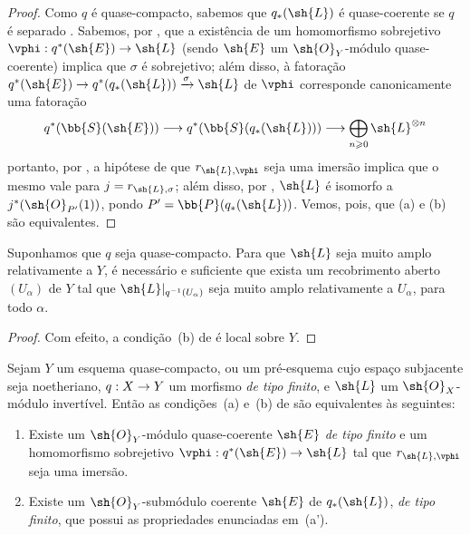 \documentclass[oneside,10pt]{amsart}
\makeatletter
\renewcommand{\geq}{\geqslant}
\newcommand{\ega@arrow}[2]{\mathchoice{#1}{#2}{#2}{#2}}
\renewcommand{\to}{\ega@arrow{\longrightarrow}{\rightarrow}}
\newcommand{\oldpage}[2][]{\marginnote{\normalfont\footnotesize\textbf{#1}~|~#2}\ignorespaces}
\let\EGAOriginalLabel\label
\renewcommand{\label}[1]{\phantomsection\EGAOriginalLabel{#1}}
\makeatother
\begin{document}
\begin{proof}
Como $q$ é quase-compacto, sabemos que $q_*(\sh{L})$ é quase-coerente se $q$ é separado .
\oldpage[II]{80}
Sabemos, por , que a existência de um homomorfismo sobrejetivo $\vphi:q^*(\sh{E})\to\sh{L}$ (sendo $\sh{E}$ um $\sh{O}_Y$-módulo quase-coerente) implica que $\sigma$ é sobrejetivo;
além disso, à fatoração $q^*(\sh{E})\to q^*(q_*(\sh{L}))\xrightarrow{\sigma}\sh{L}$ de $\vphi$ corresponde canonicamente uma fatoração
\[
  q^*(\bb{S}(\sh{E}))\to q^*(\bb{S}(q_*(\sh{L})))\to\bigoplus_{n\geq0}\sh{L}^{\otimes n}
\]
portanto, por , a hipótese de que $r_{\sh{L},\vphi}$ seja uma imersão implica que o mesmo vale para $j=r_{\sh{L},\sigma}$;
além disso, por , $\sh{L}$ é isomorfo a $j^*(\sh{O}_{P'}(1))$, pondo $P'=\bb{P}(q_*(\sh{L}))$.
Vemos, pois, que (a) e (b) são equivalentes.
\end{proof}

\begin{corollary}[4.4.5]
\label{II.4.4.5}
Suponhamos que $q$ seja quase-compacto.
Para que $\sh{L}$ seja muito amplo relativamente a $Y$, é necessário e suficiente que exista um recobrimento aberto $(U_\alpha)$ de $Y$ tal que $\sh{L}|_{q^{-1}(U_\alpha)}$ seja muito amplo relativamente a $U_\alpha$, para todo $\alpha$.
\end{corollary}

\begin{proof}
Com efeito, a condição~(b) de  é local sobre $Y$.
\end{proof}

\begin{proposition}[4.4.6]
\label{II.4.4.6}
Sejam $Y$ um esquema quase-compacto, ou um pré-esquema cujo espaço subjacente seja noetheriano, $q:X\to Y$ um morfismo \emph{de tipo finito}, e $\sh{L}$ um $\sh{O}_X$-módulo invertível.
Então as condições~(a) e~(b) de  são equivalentes às seguintes:
\begin{enumerate}
  \item[\rm{(a')}] Existe um $\sh{O}_Y$-módulo quase-coerente $\sh{E}$ \emph{de tipo finito} e um homomorfismo sobrejetivo $\vphi:q^*(\sh{E})\to\sh{L}$ tal que $r_{\sh{L},\vphi}$ seja uma imersão.
  \item[\rm{(b')}] Existe um $\sh{O}_Y$-submódulo coerente $\sh{E}$ de $q_*(\sh{L})$, \emph{de tipo finito}, que possui as propriedades enunciadas em~(a').
\end{enumerate}
\end{proposition}
\end{document}
